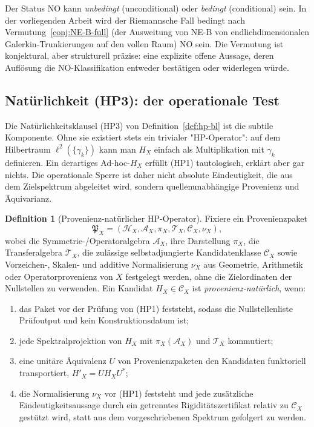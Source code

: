 \documentclass[11pt]{article}
\theoremstyle{definition}
\newtheorem{definition}[theorem]{Definition}
\theoremstyle{remark}
\begin{document}
Der Status $\mathrm{NO}$ kann \emph{unbedingt} (unconditional) oder
\emph{bedingt} (conditional) sein. In der vorliegenden Arbeit wird der Riemannsche
Fall bedingt nach Vermutung~\ref{conj:NE-B-full} (der Ausweitung von NE-B
von endlichdimensionalen Galerkin-Trunkierungen auf den vollen Raum) $\mathrm{NO}$
sein. Die Vermutung ist konjektural, aber strukturell präzise: eine explizite
offene Aussage, deren Auflösung die NO-Klassifikation entweder bestätigen
oder widerlegen würde.

\subsection{Natürlichkeit (HP3): der operationale Test}

Die Natürlichkeitsklausel (HP3) von Definition~\ref{def:hp-bl} ist die
subtile Komponente. Ohne sie existiert stets ein trivialer "HP-Operator": auf
dem Hilbertraum $\ell^2(\{\gamma_k\})$ kann man $H_X$ einfach als
Multiplikation mit $\gamma_k$ definieren. Ein derartiges Ad-hoc-$H_X$ erfüllt
(HP1) tautologisch, erklärt aber gar nichts. Die operationale Sperre ist daher
nicht absolute Eindeutigkeit, die aus dem Zielspektrum abgeleitet wird, sondern
quellenunabhängige Provenienz und Äquivarianz.

\begin{definition}[Provenienz-natürlicher HP-Operator]\label{def:natural-hp}
Fixiere ein Provenienzpaket
\[
 \mathfrak{P}_X=(\mathcal{H}_X,\mathcal{A}_X,\pi_X,
 \mathcal{T}_X,\mathcal{C}_X,\nu_X),
\]
wobei die Symmetrie-/Operatoralgebra $\mathcal{A}_X$, ihre Darstellung
$\pi_X$, die Transferalgebra $\mathcal{T}_X$, die zulässige
selbstadjungierte Kandidatenklasse $\mathcal{C}_X$ sowie Vorzeichen-,
Skalen- und additive Normalisierung $\nu_X$ aus Geometrie, Arithmetik
oder Operatorprovenienz von $X$ festgelegt werden, ohne die Zielordinaten
der Nullstellen zu verwenden. Ein Kandidat
$H_X\in\mathcal{C}_X$ ist \emph{provenienz-natürlich}, wenn:
\begin{enumerate}
\item[(N1)] das Paket vor der Prüfung von (HP1) feststeht, sodass die
  Nullstellenliste Prüfoutput und kein Konstruktionsdatum ist;
\item[(N2)] jede Spektralprojektion von $H_X$ mit
  $\pi_X(\mathcal{A}_X)$ und $\mathcal{T}_X$ kommutiert;
\item[(N3)] eine unitäre Äquivalenz $U$ von Provenienzpaketen den
  Kandidaten funktoriell transportiert, $H'_X=UH_XU^*$;
\item[(N4)] die Normalisierung $\nu_X$ vor (HP1) feststeht und jede
  zusätzliche Eindeutigkeitsaussage durch ein getrenntes
  Rigiditätszertifikat relativ zu $\mathcal{C}_X$ gestützt wird, statt
  aus dem vorgeschriebenen Spektrum gefolgert zu werden.
\end{enumerate}
\end{definition}
\end{document}
